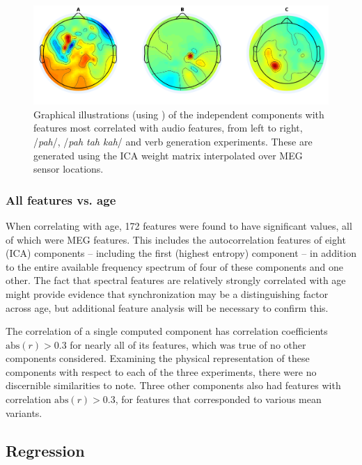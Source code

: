 \documentclass[utf8]{frontiersSCNS} %
\begin{document}
\begin{figure}[t]
  \centering
  \includegraphics[width=\linewidth]{AllComponents.png}
  \caption{Graphical illustrations (using \cite{Delorme04eeglab}) of the independent components with features most correlated with audio features, from left to right, /{\em pah}/, /{\em pah tah kah}/ and verb generation experiments. These are generated using the ICA weight matrix interpolated over MEG sensor locations. }
  \label{fig:components}
\end{figure}
 
\subsubsection{All features vs. age}

When correlating with age, 172 features were found to have significant values, all of which were MEG features. This includes the autocorrelation features of eight (ICA) components -- including the first (highest entropy) component -- in addition to the entire available frequency spectrum of four of these components and one other. The fact that spectral features are relatively strongly correlated with age might provide evidence that synchronization may be a distinguishing factor across age, but additional feature analysis will be necessary to confirm this.

The correlation of a single computed component has correlation coefficients $\text{abs}(r)>0.3$ for nearly all of its features, which was true of no other components considered. Examining the physical representation of these components with respect to each of the three experiments, there were no discernible similarities to note. Three other components also had features with correlation $\text{abs}(r)>0.3$, for features that corresponded to various mean variants.

\subsection{Regression}
\end{document}
